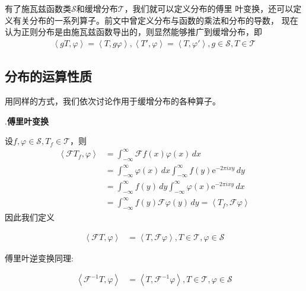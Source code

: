 \documentclass{ctexbook}
\begin{document}
有了施瓦兹函数类$\mathcal{S} $和缓增分布$\mathcal{T} $，我们就可以定义分布的傅里
叶变换，还可以定义有关分布的一系列算子。前文中曾定义分布与函数的乘法和分布的导数，
现在认为正则分布是由施瓦兹函数导出的，则显然能够推广到缓增分布，即\begin{align}
    \left\langle gT,\varphi\right\rangle=\left\langle T,g\varphi\right\rangle,\left\langle T',\varphi\right\rangle=\left\langle T,\varphi'\right\rangle,g\in\mathcal{S} ,T\in\mathcal{T}
\end{align}

\subsection{分布的运算性质}\label{sub:operation_of_distribution}
用同样的方式，我们依次讨论作用于缓增分布的各种算子。

.\textbf{傅里叶变换}

设$f,\varphi\in\mathcal{S} ,T_f\in\mathcal{T} $，则
\begin{align*}
    \left\langle\mathcal{F}T_f,\varphi\right\rangle & =\int_{-\infty}^{\infty}\mathcal{F}f(x)\varphi(x)\,dx                                       \\
                                         & =\int_{-\infty}^{\infty}\varphi(x)\,dx\int_{-\infty}^{\infty}f(y)\mathrm{e}^{-2\pi ixy}\,dy          \\
                                         & =\int_{-\infty}^{\infty}f(y)\,dy\int_{-\infty}^{\infty}\varphi(x)\mathrm{e}^{-2\pi ixy}\,dx          \\
                                         & =\int_{-\infty}^{\infty}f(y)\mathcal{F}\varphi(y)\,dy=\left\langle T_f,\mathcal{F}\varphi\right\rangle
\end{align*}
因此我们定义\begin{definition}[分布的傅里叶变换]
    \begin{align*}
        \left\langle \mathcal{F} T,\varphi\right\rangle & =\left\langle T,\mathcal{F} \varphi\right\rangle,T\in\mathcal{T} ,\varphi\in\mathcal{S}
    \end{align*}
\end{definition}

傅里叶逆变换同理:
\begin{definition}[分布的傅里叶反变换]
    \begin{align*}
        \left\langle \mathcal{F} ^{-1}T,\varphi\right\rangle & =\left\langle T,\mathcal{F} ^{-1}\varphi\right\rangle,T\in\mathcal{T} ,\varphi\in\mathcal{S}
    \end{align*}
\end{definition}
\end{document}
